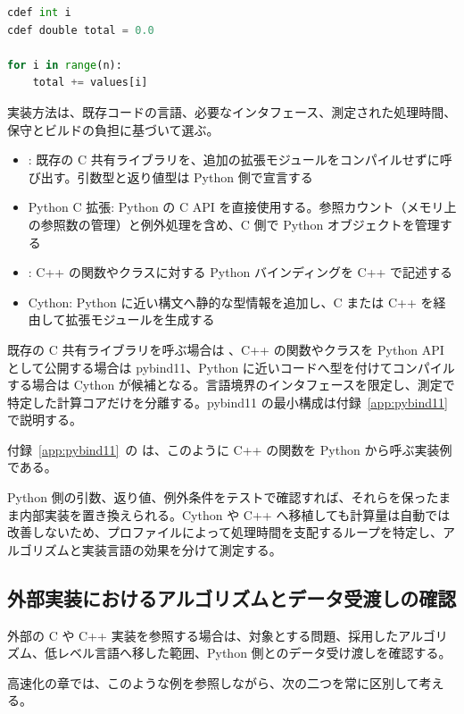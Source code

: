 \begin{lstlisting}[language=Python]
cdef int i
cdef double total = 0.0

for i in range(n):
    total += values[i]
\end{lstlisting}

実装方法は、既存コードの言語、必要なインタフェース、測定された処理時間、保守とビルドの負担に基づいて選ぶ。

\begin{itemize}
\item {}: 既存の C 共有ライブラリを、追加の拡張モジュールをコンパイルせずに呼び出す。引数型と返り値型は Python 側で宣言する
\item Python C 拡張: Python の C API を直接使用する。参照カウント（メモリ上の参照数の管理）と例外処理を含め、C 側で Python オブジェクトを管理する
\item {}: C++ の関数やクラスに対する Python バインディングを C++ で記述する
\item Cython: Python に近い構文へ静的な型情報を追加し、C または C++ を経由して拡張モジュールを生成する
\end{itemize}

既存の C 共有ライブラリを呼ぶ場合は 、C++ の関数やクラスを Python API として公開する場合は pybind11、Python に近いコードへ型を付けてコンパイルする場合は Cython が候補となる。言語境界のインタフェースを限定し、測定で特定した計算コアだけを分離する。pybind11 の最小構成は付録~\ref{app:pybind11} で説明する。

付録~\ref{app:pybind11}~の  は、このように C++ の関数を Python から呼ぶ実装例である。

Python 側の引数、返り値、例外条件をテストで確認すれば、それらを保ったまま内部実装を置き換えられる。Cython や C++ へ移植しても計算量は自動では改善しないため、プロファイルによって処理時間を支配するループを特定し、アルゴリズムと実装言語の効果を分けて測定する。

\subsection{外部実装におけるアルゴリズムとデータ受渡しの確認}

外部の C や C++ 実装を参照する場合は、対象とする問題、採用したアルゴリズム、低レベル言語へ移した範囲、Python 側とのデータ受け渡しを確認する。

高速化の章では、このような例を参照しながら、次の二つを常に区別して考える。

